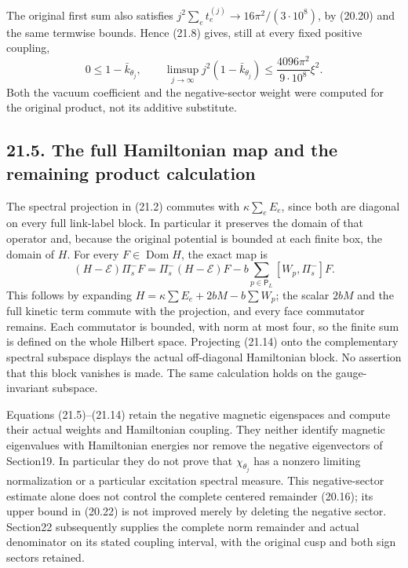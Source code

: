 \documentclass[
]{article}
\begin{document}
The original first sum also satisfies
\(j^2\sum_e t_e^{(j)}\to16\pi^2/(3\cdot10^8)\), by (20.20) and the same
termwise bounds. Hence (21.8) gives, still at every fixed positive
coupling, \[
0\le1-\bar k_{\theta_j},\qquad
\limsup_{j\to\infty}j^2(1-\bar k_{\theta_j})
 \le\frac{4096\pi^2}{9\cdot10^8}\xi^2 .                        \tag{21.13}
\] Both the vacuum coefficient and the negative-sector weight were
computed for the original product, not its additive substitute.

\subsection{21.5. The full Hamiltonian map and the remaining product
calculation}\label{the-full-hamiltonian-map-and-the-remaining-product-calculation}

The spectral projection in (21.2) commutes with \(\kappa\sum_eE_e\),
since both are diagonal on every full link-label block. In particular it
preserves the domain of that operator and, because the original
potential is bounded at each finite box, the domain of \(H\). For every
\(F\in\operatorname{Dom}H\), the exact map is \[
(H-\mathcal E)\Pi_s^-F
 =\Pi_s^-(H-\mathcal E)F
          -b\sum_{p\in\mathsf P_L}[W_p,\Pi_s^-]F .
                                                               \tag{21.14}
\] This follows by expanding \(H=\kappa\sum E_e+2bM-b\sum W_p\); the
scalar \(2bM\) and the full kinetic term commute with the projection,
and every face commutator remains. Each commutator is bounded, with norm
at most four, so the finite sum is defined on the whole Hilbert space.
Projecting (21.14) onto the complementary spectral subspace displays the
actual off-diagonal Hamiltonian block. No assertion that this block
vanishes is made. The same calculation holds on the gauge-invariant
subspace.

Equations (21.5)--(21.14) retain the negative magnetic eigenspaces and
compute their actual weights and Hamiltonian coupling. They neither
identify magnetic eigenvalues with Hamiltonian energies nor remove the
negative eigenvectors of Section19. In particular they do not prove that
\(\chi_{\theta_j}\) has a nonzero limiting normalization or a particular
excitation spectral measure. This negative-sector estimate alone does
not control the complete centered remainder (20.16); its upper bound in
(20.22) is not improved merely by deleting the negative sector.
Section22 subsequently supplies the complete norm remainder and actual
denominator on its stated coupling interval, with the original cusp and
both sign sectors retained.
\end{document}
